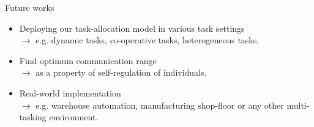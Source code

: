 \documentclass[handout,draft]{beamer}
\begin{document}
\begin{frame}[t]{Future works}
  \begin{itemize}
    \item \normalsize \alert{Deploying our task-allocation model in various task settings}\\
    $\rightarrow$ \small e.g. dynamic tasks, co-operative tasks, heterogeneous tasks.
    \item \normalsize \alert{Find optimum communication range}\\
    $\rightarrow$ \small as a property of self-regulation of individuals.
    \item \normalsize \alert{Real-world implementation}\\
    $\rightarrow$ \small e.g. warehouse automation, manufacturing shop-floor or any other multi-tasking environment.
    \end{itemize}
\end{frame}
\end{document}
